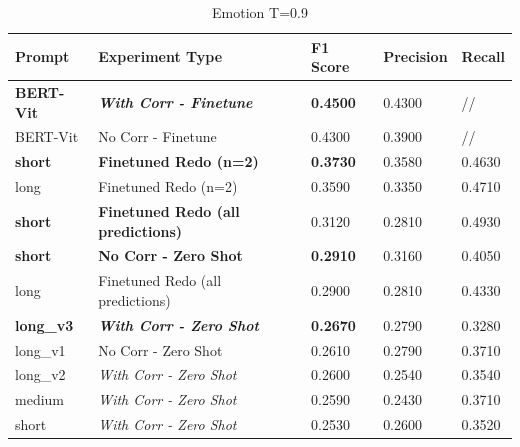 \documentclass[letterpaper,journal]{IEEEtran}
\begin{document}
\begin{table}[!t]
\centering
\caption{Emotion T=0.9}
\label{tab:pixtral_emotions_09}
\begin{tabular}{l|l|l|l|l}
\textbf{Prompt}   & \textbf{Experiment Type}                  & \textbf{\textbf{F1 Score}} & \textbf{\textbf{Precision}} & \textbf{\textbf{Recall}}  \\ 
\hline
\textbf{BERT-Vit} & \textit{\textbf{With Corr - Finetune}}    & \textbf{0.4500}            & 0.4300                      & //                        \\
BERT-Vit          & No Corr - Finetune                        & 0.4300                     & 0.3900                      & //                        \\
\textbf{short}    & \textbf{Finetuned Redo (n=2)}             & \textbf{0.3730}            & 0.3580                      & 0.4630                    \\
long              & Finetuned Redo (n=2)                      & 0.3590                     & 0.3350                      & 0.4710                    \\
\textbf{short}    & \textbf{Finetuned Redo (all predictions)} & 0.3120                     & 0.2810                      & 0.4930                    \\
\textbf{short}    & \textbf{No Corr - Zero Shot}              & \textbf{0.2910}            & 0.3160                      & 0.4050                    \\
long              & Finetuned Redo (all
  predictions)        & 0.2900                     & 0.2810                      & 0.4330                    \\
\textbf{long\_v3} & \textit{\textbf{With Corr - Zero Shot}}   & \textbf{0.2670}            & 0.2790                      & 0.3280                    \\
long\_v1          & No Corr - Zero Shot                       & 0.2610                     & 0.2790                      & 0.3710                    \\
long\_v2          & \textit{With Corr - Zero Shot}            & 0.2600                     & 0.2540                      & 0.3540                    \\
medium            & \textit{With Corr - Zero Shot}            & 0.2590                     & 0.2430                      & 0.3710                    \\
short             & \textit{With Corr - Zero Shot}            & 0.2530                     & 0.2600                      & 0.3520                    \\

\end{tabular}
\end{table}
\end{document}
